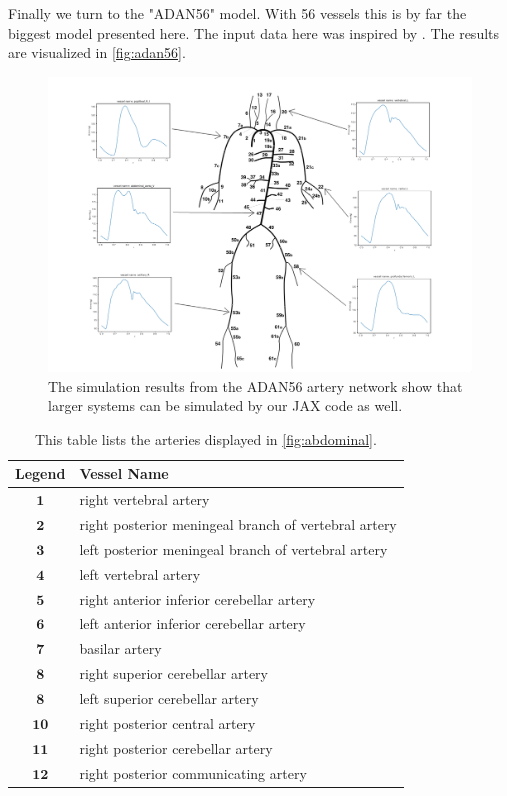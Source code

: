 \documentclass[a4paper, oneside]{discothesis}
\begin{document}
Finally we turn to the "ADAN56" model.
With 56 vessels this is by far the biggest model presented here.
The input data here was inspired by \cite{murgo1980aortic}.
The results are visualized in \autoref{fig:adan56}.
\begin{figure} [!ht]
	\centering
	\includegraphics[width=0.8\columnwidth]{figures/adan56_annotated.png}
	\caption{The simulation results from the ADAN56 artery network show that larger systems can be simulated by our JAX code as well.}
	\label{fig:adan56}
\end{figure}
\begin{table}[!ht]
	\begin{center}
		\begin{tabular}{|c|l|}
			\hline
			Legend & Vessel Name\\
			\hline
			$\mathbf{1}$& right vertebral artery \\ 
			$\mathbf{2}$& right posterior meningeal branch of vertebral artery \\
			$\mathbf{3}$& left posterior meningeal branch of vertebral artery\\
			$\mathbf{4}$& left vertebral artery \\ 
			$\mathbf{5}$& right anterior inferior cerebellar artery \\
			$\mathbf{6}$& left anterior inferior cerebellar artery \\
			$\mathbf{7}$& basilar artery \\
			$\mathbf{8}$& right superior cerebellar artery \\
			$\mathbf{8}$& left superior cerebellar artery \\
			$\mathbf{10}$& right posterior central artery \\
			$\mathbf{11}$& right posterior cerebellar artery \\
			$\mathbf{12}$& right posterior communicating artery \\
			\hline
		\end{tabular}
	\end{center}
	\caption{This table lists the arteries displayed in \autoref{fig:abdominal}.}
	\label{tab:cere}
\end{table}
\end{document}
